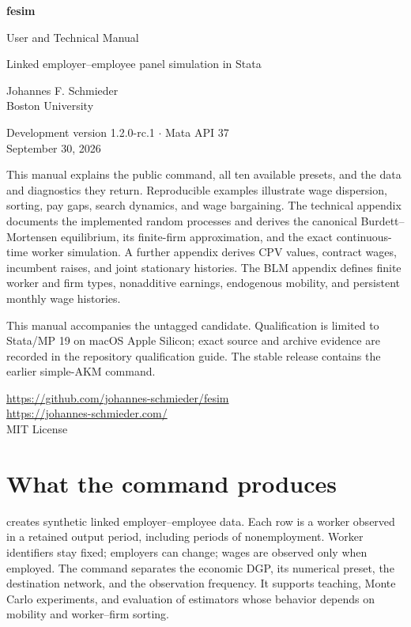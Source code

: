 \documentclass[11pt,letterpaper]{article}
\newcommand{\code}[1]{\texttt{\detokenize{#1}}}
\begin{document}
\hypersetup{pageanchor=false}
\begin{titlepage}
\vspace*{0.8in}
{\color{ink}\Huge\bfseries fesim\par}
\vspace{0.3in}
{\LARGE User and Technical Manual\par}
\vspace{0.15in}
{\large Linked employer--employee panel simulation in Stata\par}
\vspace{0.5in}
Johannes F. Schmieder\\
Boston University
\vspace{0.35in}

Development version 1.2.0-rc.1 \quad $\cdot$ \quad Mata API 37\\
September 30, 2026
\vspace{0.5in}

\begin{minipage}{0.91\textwidth}
This manual explains the public command, all ten available presets, and the
data and diagnostics they return. Reproducible examples illustrate wage
dispersion, sorting, pay gaps, search dynamics, and wage bargaining. The technical appendix
documents the implemented random processes and derives the canonical
Burdett--Mortensen equilibrium, its finite-firm approximation, and the exact
continuous-time worker simulation. A further appendix derives CPV values,
contract wages, incumbent raises, and joint stationary histories. The BLM
appendix defines finite worker and firm types, nonadditive earnings,
endogenous mobility, and persistent monthly wage histories.

This manual accompanies the untagged \code{1.2.0-rc.1} candidate.
Qualification is limited to Stata/MP 19 on macOS Apple Silicon; exact source
and archive evidence are recorded in the repository qualification guide.
The stable \code{v0.1.0} release contains the earlier simple-AKM command.
\end{minipage}
\vfill
\url{https://github.com/johannes-schmieder/fesim}\\
\url{https://johannes-schmieder.com/}\\
MIT License
\end{titlepage}
\hypersetup{pageanchor=true}
\tableofcontents
\clearpage
{}

\section{What the command produces}
\code{fesim} creates synthetic linked employer--employee data. Each row is a
worker observed in a retained output period, including periods of
nonemployment. Worker identifiers stay fixed; employers can change; wages
are observed only when employed. The command separates the economic DGP,
its numerical preset, the destination network, and the observation frequency.
It supports teaching, Monte Carlo experiments, and evaluation of estimators
whose behavior depends on mobility and worker--firm sorting.
\end{document}
